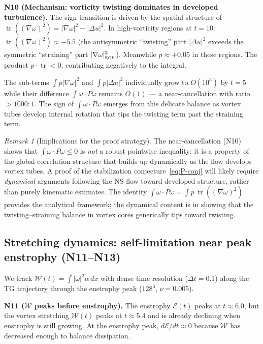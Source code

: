 \documentclass[11pt,a4paper]{article}
\theoremstyle{plain}
\theoremstyle{definition}
\theoremstyle{remark}
\newtheorem{remark}[theorem]{Remark}
\DeclareMathOperator{\tr}{tr}
\begin{document}
\textbf{N10 (Mechanism: vorticity twisting
dominates in developed turbulence).}
The sign transition is driven by the spatial
structure of $\tr((\nabla\omega)^2)
= |\nabla\omega|^2-|\Delta u|^2$.  In
high-vorticity regions at $t=10$:
$\tr((\nabla\omega)^2)\approx -5.5$ (the
antisymmetric ``twisting'' part $|\Delta u|^2$
exceeds the symmetric ``straining'' part
$|\nabla\omega|^2_{\rm sym}$).  Meanwhile
$p\approx +0.05$ in these regions.  The product
$p\cdot\tr<0$, contributing negatively to the
integral.

The sub-terms $\int p|\nabla\omega|^2$ and
$\int p|\Delta u|^2$ individually grow to
$O(10^3)$ by $t=5$ while their difference
$\int\omega\cdot P\omega$ remains $O(1)$ ---
a near-cancellation with ratio $>1000:1$.
The sign of $\int\omega\cdot P\omega$ emerges from
this delicate balance as vortex tubes develop
internal rotation that tips the twisting term
past the straining term.

\begin{remark}[Implications for the proof strategy]
\label{rem:proof-strategy}
The near-cancellation (N10) shows that
$\int\omega\cdot P\omega\leq 0$ is \emph{not} a
robust pointwise inequality: it is a property of
the global correlation structure that builds up
dynamically as the flow develops vortex tubes.
A proof of the stabilization
conjecture~\eqref{eq:P-conj} will likely
require \emph{dynamical} arguments following the
NS flow toward developed structure, rather than
purely kinematic estimates.  The identity
$\int\omega\cdot P\omega = \int p\,\tr((\nabla\omega)^2)$
provides the analytical framework; the dynamical
content is in showing that the twisting--straining
balance in vortex cores generically tips toward
twisting.
\end{remark}

\subsection{Stretching dynamics: self-limitation
near peak enstrophy (N11--N13)}

We track $\mathcal{W}(t)=\int|\omega|^2\alpha\,dx$
with dense time resolution ($\Delta t=0.1$) along
the TG trajectory through the enstrophy peak
($128^3$, $\nu=0.005$).

\textbf{N11 ($\mathcal{W}$ peaks before enstrophy).}
The enstrophy $\mathcal{E}(t)$ peaks at $t\approx 6.0$,
but the vortex stretching $\mathcal{W}(t)$ peaks at
$t\approx 5.4$ and is already declining when
enstrophy is still growing.  At the enstrophy peak,
$d\mathcal{E}/dt\approx 0$ because $\mathcal{W}$
has decreased enough to balance dissipation.
\end{document}
